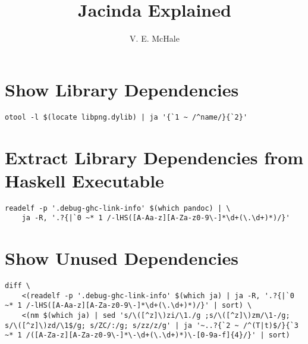 \documentclass{article}
\begin{document}
\title{Jacinda Explained}
\author{V. E. McHale}
\maketitle

\section{Show Library Dependencies}

\begin{verbatim}
otool -l $(locate libpng.dylib) | ja '{`1 ~ /^name/}{`2}'
\end{verbatim}

\section{Extract Library Dependencies from Haskell Executable}

\begin{verbatim}
readelf -p '.debug-ghc-link-info' $(which pandoc) | \
    ja -R, '.?{|`0 ~* 1 /-lHS([A-Aa-z][A-Za-z0-9\-]*\d+(\.\d+)*)/}'
\end{verbatim}

\section{Show Unused Dependencies}

\begin{verbatim}
diff \
    <(readelf -p '.debug-ghc-link-info' $(which ja) | ja -R, '.?{|`0 ~* 1 /-lHS([A-Aa-z][A-Za-z0-9\-]*\d+(\.\d+)*)/}' | sort) \
    <(nm $(which ja) | sed 's/\([^z]\)zi/\1./g ;s/\([^z]\)zm/\1-/g; s/\([^z]\)zd/\1$/g; s/ZC/:/g; s/zz/z/g' | ja '~..?{`2 ~ /^(T|t)$/}{`3 ~* 1 /([A-Za-z][A-Za-z0-9\-]*\-\d+(\.\d+)*)\-[0-9a-f]{4}/}' | sort)
\end{verbatim}
\end{document}
